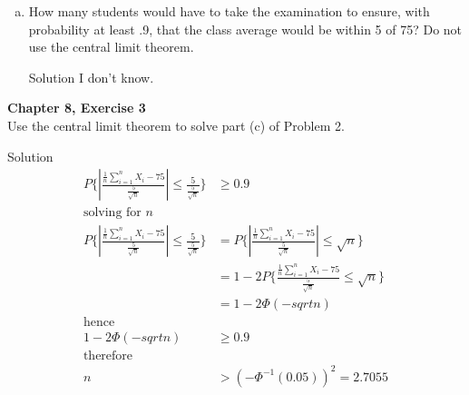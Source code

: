 \documentclass{article}
\begin{document}
\begin{spacing}{1.1}
\begin{homeworkProblem}
\begin{enumerate}[(a)]
\begin{homeworkSection}{Solution}
\begin{align*}
          k &= 2\\
          P\{ |X - 75| \ge (2)(5)\} &\le \frac{ 1}{ 4}\\
          &= 0.25\\
          \text{Therefore}\\
          P\{ |X - 75| \le 10\} &= 1 - P\{ |X - 75| \ge 10\}\\
          &= 1 - 0.25\\
          &= 0.75\\
        \end{align*}
      \end{homeworkSection}
    \item How many students would have to take the examination to 
    ensure, with probability at least .9, that the class average 
    would be within 5 of 75? Do not use the central limit theorem.
      \begin{homeworkSection}{Solution}
        I don't know.
      \end{homeworkSection}
  \end{enumerate}
\end{homeworkProblem}
  

\newpage
\begin{homeworkProblem}
  {\bf Chapter 8, Exercise 3}\\
  Use the central limit theorem to solve part (c) of Problem 2.
  \begin{homeworkSection}{Solution}
     \begin{align*}
        P\{ \left|\frac{ \frac{ 1}{ n}\sum\limits_{i = 1}^{n} X_i - 75}{ \frac{ 5}{ \sqrt{ n}}}\right| \le \frac{ 5}{ \frac{ 5}{ \sqrt{ n}}}\} &\ge 0.9\\
        \text{solving for $n$}\\
        P\{ \left|\frac{ \frac{ 1}{ n}\sum\limits_{i = 1}^{n} X_i - 75}{ \frac{ 5}{ \sqrt{ n}}}\right| \le \frac{ 5}{ \frac{ 5}{ \sqrt{ n}}}\}
        &= P\{ \left|\frac{ \frac{ 1}{ n}\sum\limits_{i = 1}^{n} X_i - 75}{ \frac{ 5}{ \sqrt{ n}}}\right| \le \sqrt{ n}\}\\
        &= 1 - 2P\{ \frac{ \frac{ 1}{ n}\sum\limits_{i = 1}^{n} X_i - 75}{ \frac{ 5}{ \sqrt{ n}}} \le \sqrt{ n}\}\\
        &= 1 - 2 \Phi(-sqrt{n})\\
        \text{hence}\\
        1 - 2 \Phi(-sqrt{n}) &\ge 0.9\\
        \text{therefore}\\
        n &> (-\Phi^{-1}(0.05))^2 = 2.7055
      \end{align*}
  \end{homeworkSection}
\end{homeworkProblem}


\end{spacing}
\end{document}
